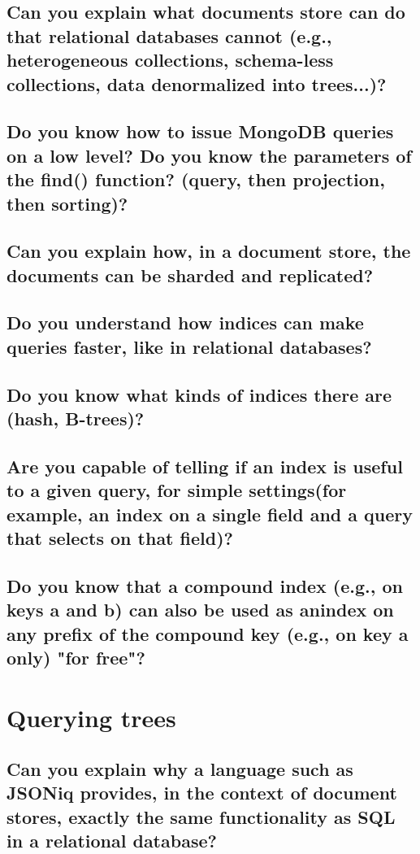 \documentclass{article}
\begin{document}
\subsection{Can you explain what documents store can do that relational databases cannot (e.g., heterogeneous collections, schema-less collections, data denormalized into trees...)?}
\subsection{Do you know how to issue MongoDB queries on a low level? Do you know the parameters of the find() function? (query, then projection, then sorting)?}
\subsection{Can you explain how, in a document store, the documents can be sharded and replicated?}
\subsection{Do you understand how indices can make queries faster, like in relational databases?}
\subsection{Do you know what kinds of indices there are (hash, B-trees)?}
\subsection{Are you capable of telling if an index is useful to a given query, for simple settings(for example, an index on a single field and a query that selects on that field)?}
\subsection{Do you know that a compound index (e.g., on keys a and b) can also be used as anindex on any prefix of the compound key (e.g., on key a only) "for free"?}

\pagebreak

\section{Querying trees}
\subsection{Can you explain why a language such as JSONiq provides, in the context of document stores, exactly the same functionality as SQL in a relational database?}
\end{document}
